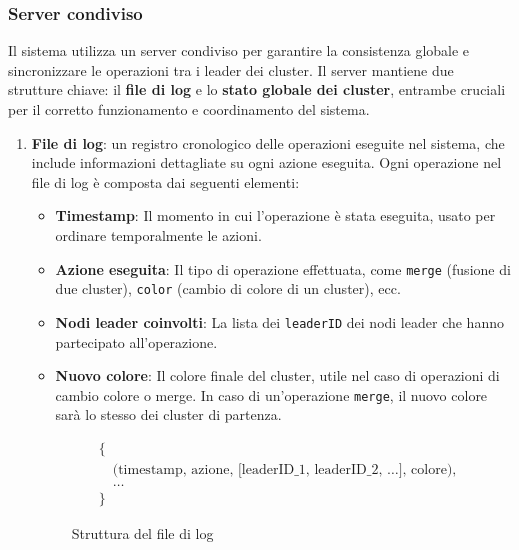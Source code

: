 \documentclass[12pt, a4paper]{report}
\begin{document}
\subsubsection{Server condiviso} 
Il sistema utilizza un server condiviso per garantire la consistenza globale e sincronizzare le operazioni tra i leader dei cluster. Il server mantiene due strutture chiave: il \textbf{file di log} e lo \textbf{stato globale dei cluster}, entrambe cruciali per il corretto funzionamento e coordinamento del sistema.

\begin{enumerate}
    \item \textbf{File di log}: un registro cronologico delle operazioni eseguite nel sistema, che include informazioni dettagliate su ogni azione eseguita. Ogni operazione nel file di log \`e composta dai seguenti elementi:
    \begin{itemize}
        \item \textbf{Timestamp}: Il momento in cui l'operazione \`e stata eseguita, usato per ordinare temporalmente le azioni.
        \item \textbf{Azione eseguita}: Il tipo di operazione effettuata, come \texttt{merge} (fusione di due cluster), \texttt{color} (cambio di colore di un cluster), ecc.
        \item \textbf{Nodi leader coinvolti}: La lista dei \texttt{leaderID} dei nodi leader che hanno partecipato all'operazione.
        \item \textbf{Nuovo colore}: Il colore finale del cluster, utile nel caso di operazioni di cambio colore o merge. In caso di un'operazione \texttt{merge}, il nuovo colore sar\`a lo stesso dei cluster di partenza.
    \end{itemize}
    \vspace{-20pt}
    \begin{figure}[H]
        \begin{align*}
            &\{ \\
            &\quad \text{(timestamp, azione, [leaderID\_1, leaderID\_2, \ldots], colore)},\\
            &\quad \ldots\\
            &\}
        \end{align*}
        \vspace{-20pt}
        \caption{Struttura del file di log}
    \end{figure}


\end{enumerate}
\end{document}

